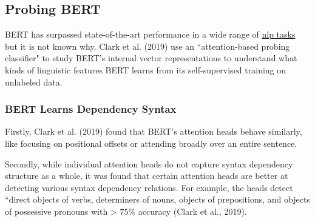 \subsection{Probing BERT} \label{sec:ProbingBERT}

BERT has surpassed state-of-the-art performance in a wide range of \hyperref[app:Appendix_NLPTasks]{nlp tasks} but it is not known why. Clark et al. (2019) use an ``attention-based probing classifier" to study BERT's internal vector representations to understand what kinds of linguistic features BERT learns from its self-supervised training on unlabeled data. 



\subsubsection{BERT Learns Dependency Syntax} \label{sec:BERTLearnsSyntax}

Firstly, Clark et al. (2019) found that BERT's attention heads behave similarly, like focusing on positional offsets or attending broadly over an entire sentence. 

Secondly, while individual attention heads do not capture syntax dependency structure as a whole, it was found that certain attention heads are better at detecting various syntax dependency relations. For example, the heads detect ``direct objects of verbs, determiners of nouns, objects of prepositions, and objects of possessive pronouns with > $75 \%$ accuracy (Clark et al., 2019). 

